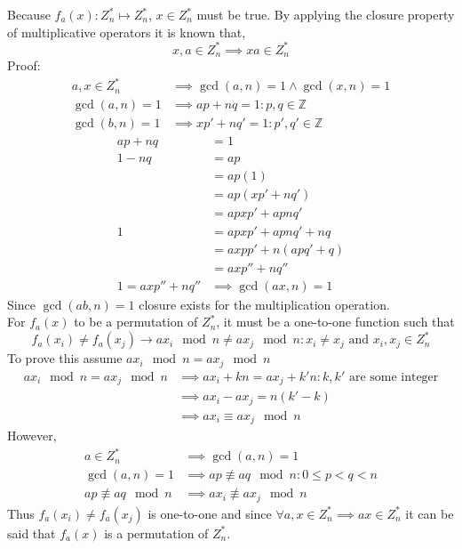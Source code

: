 \documentclass[letterpaper]{article}
\begin{document}
Because $f_a(x):Z_n^* \mapsto Z_n^*$, $x\in Z_n^*$ must be true. By applying the closure property of multiplicative operators it is known that,
\begin{equation*}
x,a\in Z_n^* \implies xa \in Z_n^*
\end{equation*}
Proof:
\begin{align*}
a,x\in Z_n^* &\implies \gcd(a,n)=1 \wedge \gcd(x,n) =1\\
\gcd(a,n)=1 &\implies ap + nq = 1: p,q\in\mathbb{Z}\\
\gcd(b,n) =1 &\implies xp' + nq' = 1: p',q'\in\mathbb{Z}
\end{align*}
\begin{align*}
ap + nq &= 1\\
1-nq &= ap \\
&= ap(1) \\
&= ap(xp'+nq')\\
&= apxp'+apnq'\\
1 &= apxp'+apnq' +nq\\
&= axpp' + n(apq'+q)\\
&= axp'' + nq''\\
1 = axp'' + nq'' &\implies \gcd(ax,n)=1
\end{align*}
Since $\gcd(ab,n)=1$ closure exists for the multiplication operation.\\
For $f_a(x)$ to be a permutation of $Z_n^*$, it must be a one-to-one function such that 
\begin{equation*}
f_a(x_i) \neq f_a(x_j) \rightarrow ax_i\mod n \neq ax_j\mod n : x_i\neq x_j \text{ and }x_i,x_j\in Z_n^*
\end{equation*}
To prove this assume $ax_i\mod n = ax_j\mod n$
\begin{align*}
ax_i\mod n = ax_j\mod n &\implies ax_i+kn = ax_j+k'n:k,k' \text{ are some integer}\\
&\implies ax_i-ax_j = n(k'-k)\\
&\implies ax_i \equiv ax_j\mod n
\end{align*}
However,
\begin{align*}
a\in Z_n^* &\implies \gcd(a,n)=1\\
\gcd(a,n)=1 &\implies ap \not\equiv aq\mod n: 0\leq p<q<n\\
ap \not\equiv aq\mod n &\implies ax_i \not\equiv ax_j\mod n
\end{align*}
Thus $f_{a}(x_i) \neq f_{a}(x_j)$ is one-to-one and since $\forall a,x\in Z_n^*\implies ax\in Z_n^*$ it can be said that $f_a(x)$ is a permutation of $Z_n^*$.
\end{document}
